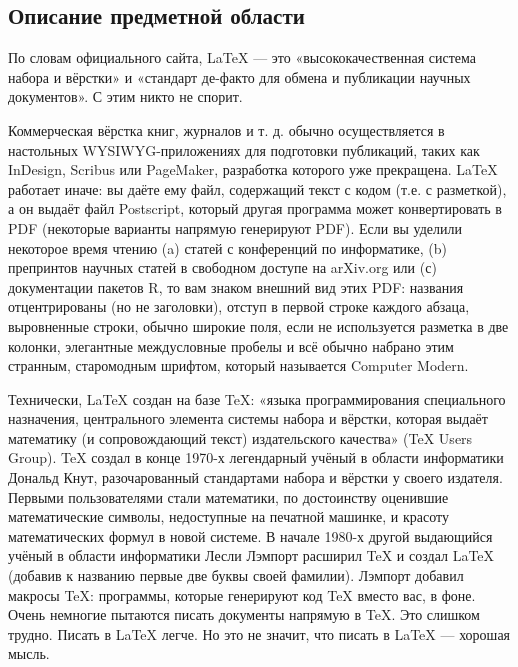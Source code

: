 \newpage
\begin{center}
\section{\fontsize{16pt}{16.8pt}Описание предметной области}
\end{center}
\par
\fontsize{14pt}{16.8pt}\selectfont
По словам официального сайта, LaTeX — это «высококачественная система набора и вёрстки» и «стандарт де-факто для обмена и публикации научных документов». С этим никто не спорит.
\par
\fontsize{14pt}{16.8pt}\selectfont
Коммерческая вёрстка книг, журналов и т. д. обычно осуществляется в настольных WYSIWYG-приложениях для подготовки публикаций, таких как InDesign, Scribus или PageMaker, разработка которого уже прекращена. LaTeX работает иначе: вы даёте ему файл, содержащий текст с кодом (т.е. с разметкой), а он выдаёт файл Postscript, который другая программа может конвертировать в PDF (некоторые варианты напрямую генерируют PDF). Если вы уделили некоторое время чтению (a) статей с конференций по информатике, (b) препринтов научных статей в свободном доступе на arXiv.org или (с) документации пакетов R, то вам знаком внешний вид этих PDF: названия отцентрированы (но не заголовки), отступ в первой строке каждого абзаца, выровненные строки, обычно широкие поля, если не используется разметка в две колонки, элегантные междусловные пробелы и всё обычно набрано этим странным, старомодным шрифтом, который называется Computer Modern.
\par
\fontsize{14pt}{16.8pt}\selectfont
Технически, LaTeX создан на базе TeX: «языка программирования специального назначения, центрального элемента системы набора и вёрстки, которая выдаёт математику (и сопровождающий текст) издательского качества» (TeX Users Group). TeX создал в конце 1970-х легендарный учёный в области информатики Дональд Кнут, разочарованный стандартами набора и вёрстки у своего издателя. Первыми пользователями стали математики, по достоинству оценившие математические символы, недоступные на печатной машинке, и красоту математических формул в новой системе. В начале 1980-х другой выдающийся учёный в области информатики Лесли Лэмпорт расширил TeX и создал LaTeX (добавив к названию первые две буквы своей фамилии). Лэмпорт добавил макросы TeX: программы, которые генерируют код TeX вместо вас, в фоне. Очень немногие пытаются писать документы напрямую в TeX. Это слишком трудно. Писать в LaTeX легче. Но это не значит, что писать в LaTeX — хорошая мысль.
